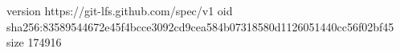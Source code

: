 version https://git-lfs.github.com/spec/v1
oid sha256:83589544672e45f4bcce3092cd9cea584b07318580d1126051440cc56f02bf45
size 174916

